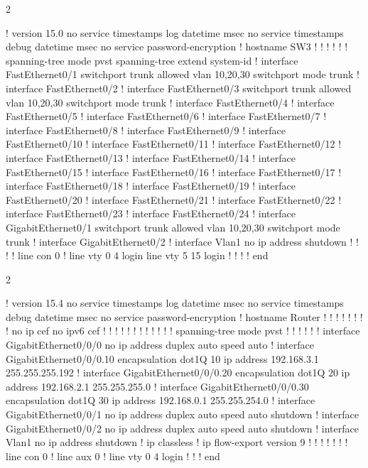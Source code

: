 \clearpage
{}

\begin{multicols}{2}
\begin{conf}
!
version 15.0
no service timestamps log datetime msec
no service timestamps debug datetime msec
no service password-encryption
!
hostname SW3
!
!
!
!
!
!
spanning-tree mode pvst
spanning-tree extend system-id
!
interface FastEthernet0/1
 switchport trunk allowed vlan 10,20,30
 switchport mode trunk
!
interface FastEthernet0/2
!
interface FastEthernet0/3
 switchport trunk allowed vlan 10,20,30
 switchport mode trunk
!
interface FastEthernet0/4
!
interface FastEthernet0/5
!
interface FastEthernet0/6
!
interface FastEthernet0/7
!
interface FastEthernet0/8
!
interface FastEthernet0/9
!
interface FastEthernet0/10
!
interface FastEthernet0/11
!
interface FastEthernet0/12
!
interface FastEthernet0/13
!
interface FastEthernet0/14
!
interface FastEthernet0/15
!
interface FastEthernet0/16
!
interface FastEthernet0/17
!
interface FastEthernet0/18
!
interface FastEthernet0/19
!
interface FastEthernet0/20
!
interface FastEthernet0/21
!
interface FastEthernet0/22
!
interface FastEthernet0/23
!
interface FastEthernet0/24
!
interface GigabitEthernet0/1
 switchport trunk allowed vlan 10,20,30
 switchport mode trunk
!
interface GigabitEthernet0/2
!
interface Vlan1
 no ip address
 shutdown
!
!
!
!
line con 0
!
line vty 0 4
 login
line vty 5 15
 login
!
!
!
!
end
\end{conf}
\end{multicols}

\clearpage
{}

\begin{multicols}{2}
\begin{conf}
!
version 15.4
no service timestamps log datetime msec
no service timestamps debug datetime msec
no service password-encryption
!
hostname Router
!
!
!
!
!
!
!
!
no ip cef
no ipv6 cef
!
!
!
!
!
!
!
!
!
!
!
!
spanning-tree mode pvst
!
!
!
!
!
!
interface GigabitEthernet0/0/0
 no ip address
 duplex auto
 speed auto
!
interface GigabitEthernet0/0/0.10
 encapsulation dot1Q 10
 ip address 192.168.3.1 255.255.255.192
!
interface GigabitEthernet0/0/0.20
 encapsulation dot1Q 20
 ip address 192.168.2.1 255.255.255.0
!
interface GigabitEthernet0/0/0.30
 encapsulation dot1Q 30
 ip address 192.168.0.1 255.255.254.0
!
interface GigabitEthernet0/0/1
 no ip address
 duplex auto
 speed auto
 shutdown
!
interface GigabitEthernet0/0/2
 no ip address
 duplex auto
 speed auto
 shutdown
!
interface Vlan1
 no ip address
 shutdown
!
ip classless
!
ip flow-export version 9
!
!
!
!
!
!
!
line con 0
!
line aux 0
!
line vty 0 4
 login
!
!
!
end
\end{conf}
\end{multicols}

